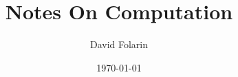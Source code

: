 \documentclass[a4paper,twoside]{scrbook}
\begin{document}
\title{Notes On Computation }
\date{\today}
\author{David Folarin}
\frontmatter
\maketitle
\tableofcontents
\mainmatter




\end{document}
